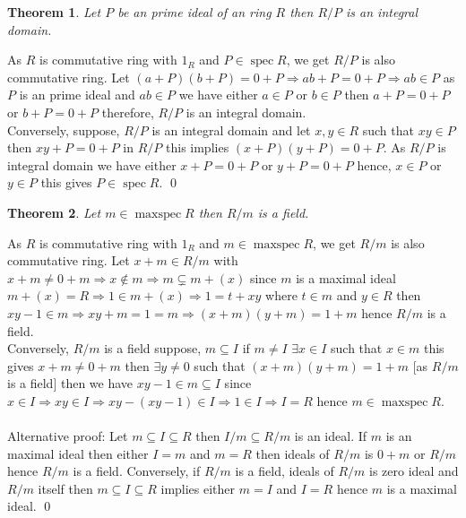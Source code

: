 \documentclass[11pt]{amsart}
\newtheorem{theorem}{Theorem}[section]
\begin{document}
\begin{theorem}
Let $P$ be an prime ideal of an ring $R$ then $R/P$ is an integral domain.
\end{theorem}
\proof As $R$ is commutative ring with $1_R$ and $P\in \operatorname{spec}R$, we get $R/P$ is also commutative ring. Let $(a+P)(b+P)=0+P \Rightarrow ab+P=0+P \Rightarrow ab\in P$ as $P$ is an prime ideal and $ab\in P$ we have either $a\in P$ or $b\in P$ then $a+P=0+P$ or $b+P=0+P$ therefore, $R/P$ is an integral domain.\\
Conversely, suppose, $R/P$ is an integral domain and let $x,y\in R$ such that $xy\in P$ then $xy+P=0+P$ in $R/P$ this implies $(x+P)(y+P)=0+P.$ As $R/P$ is integral domain we have either $x+P=0+P$ or $y+P=0+P$ hence, $x\in P$ or $y\in P$ this gives $P\in \operatorname{spec}R.$ \qed
\begin{theorem}
Let $m\in \operatorname{maxspec}R$  then $R/m$ is a field.
\end{theorem}
\proof As $R$ is commutative ring with $1_R$ and $m\in \operatorname{maxspec}R$, we get $R/m$ is also commutative ring. Let $x+m\in R/m$ with $x+m\neq 0+m \Rightarrow x\notin m \Rightarrow m\subsetneq m+(x)$ since $m$ is a maximal ideal $m+(x)=R\Rightarrow 1\in m+(x) \Rightarrow 1=t+xy$ where $t\in m$ and $y\in R$ then $xy-1\in m\Rightarrow xy+m=1=m\Rightarrow (x+m)(y+m)=1+m$ hence $R/m$ is a field.\\
Conversely, $R/m$ is a field suppose, $m\subseteq I$ if $m\neq I$ $\exists x\in I$ such that $x\in m$ this gives $x+m\neq 0+m$ then $\exists y\neq 0$ such that $(x+m)(y+m)=1+m$ [as $R/m$ is a field] then we have $xy-1\in m\subseteq I$ since $x\in I \Rightarrow xy\in I \Rightarrow xy-(xy-1)\in I \Rightarrow 1\in I \Rightarrow I=R$ hence $m\in \operatorname{maxspec}R.$\\\\
Alternative proof: Let $m\subseteq I\subseteq R$ then $I/m\subseteq R/m$ is an ideal. If $m$ is an maximal ideal then either $I=m$ and $m=R$ then ideals of $R/m$ is $0+m$ or $R/m$ hence $R/m$ is a field. Conversely, if $R/m$ is a field, ideals of $R/m$ is zero ideal and $R/m$ itself then $m\subseteq I\subseteq R$ implies either $m=I$ and $I=R$ hence $m$ is a maximal ideal. \qed
\end{document}
